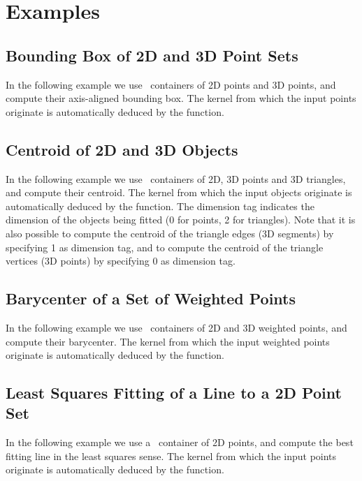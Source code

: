 \section{Examples\label{subsec:pca_examples}}

\subsection{Bounding Box of 2D and 3D Point Sets}
In the following example we use \stl\ containers of 2D points and 3D points, and compute their axis-aligned bounding box. The kernel from which the input points originate is automatically deduced by the function.

\subsection{Centroid of 2D and 3D Objects}
In the following example we use \stl\ containers of 2D, 3D points and 3D triangles, and compute their centroid. The kernel from which the input objects originate is automatically deduced by the function. The dimension tag indicates the dimension of the objects being fitted (0 for points, 2 for triangles). Note that it is also possible to compute the centroid of the triangle edges (3D segments) by specifying 1 as dimension tag, and to compute the centroid of the triangle vertices (3D points) by specifying 0 as dimension tag. 

\subsection{Barycenter of a Set of Weighted Points}
In the following example we use \stl\ containers of 2D and 3D weighted points, and compute their barycenter. The kernel from which the input weighted points originate is automatically deduced by the function. 

\subsection{Least Squares Fitting of a Line to a 2D Point Set}
In the following example we use a \stl\ container of 2D points, and compute the best fitting line in the least squares sense. The kernel from which the input points originate is automatically deduced by the function.

